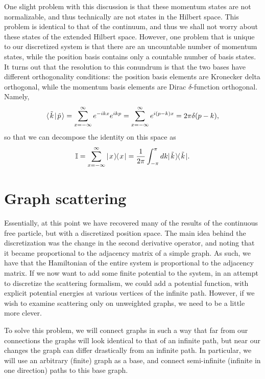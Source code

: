 \documentclass[../thesis-main/thesis-main]{subfiles}
\begin{document}
One slight problem with this discussion is that these momentum states are not normalizable, and thus technically are not states in the Hilbert space.  This problem is identical to that of the continuum, and thus we shall not worry about these states of the extended Hilbert space.  However, one problem that is unique to our discretized system is that  there are an uncountable number of momentum states, while the position basis contains only a countable number of basis states.  It turns out that the resolution to this conundrum is that the two bases have different orthogonality conditions: the position basis elements are Kronecker delta orthogonal, while the momentum basis elements are Dirac $\delta$-function orthogonal.  Namely,
\begin{equation}
  \langle\mspace{2mu} \tilde{k} \mspace{2mu} | \mspace{2mu} \tilde{p}\mspace{2mu} \rangle = \sum_{x=-\infty}^\infty e^{- i k x} e^{i k p} = \sum_{x=-\infty}^\infty e^{i (p-k) x} = 2\pi \delta(p-k),
\end{equation}
so that we can decompose the identity on this space as 
\begin{equation}
\mathbb{I} = \sum_{x=-\infty}^\infty |\mspace{2mu} x \mspace{2mu} \rangle\mspace{-2mu}\langle\mspace{2mu} x \mspace{2mu} | = \frac{1}{2\pi} \int_{-\pi}^\pi dk |\mspace{2mu} \tilde{k} \mspace{2mu} \rangle\mspace{-2mu}\langle\mspace{2mu} \tilde{k} \mspace{2mu} |.
\end{equation}


\section{Graph scattering}

Essentially, at this point we have recovered many of the results of the continuous free particle, but with a discretized position space.  The main idea behind the discretization was the change in the second derivative operator, and noting that it became proportional to the adjacency matrix of a simple graph.  As such, we have that the Hamiltonian of the entire system is proportional to the adjacency matrix.  If we now want to add some finite potential to the system, in an attempt to discretize the scattering formalism, we could add a potential function, with explicit potential energies at various vertices of the infinite path.  However, if we wish to examine scattering only on unweighted graphs, we need to be a little more clever.  

To solve this problem, we will connect graphs in such a way that far from our connections the graphs will look identical to that of an infinite path, but near our changes the graph can differ drastically from an infinite path.  In particular, we will use an arbitrary (finite) graph as a base, and connect semi-infinite (infinite in one direction) paths to this base graph.
\end{document}
